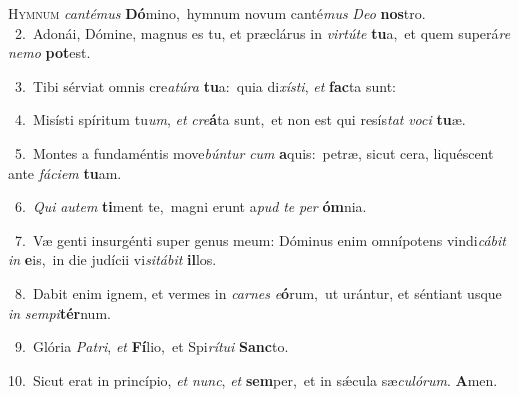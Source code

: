 \lettrine{\initial\textcolor{\initialcolor}{H}}{ymnum} \textit{can}\-\textit{té}\textit{mus} \textbf{Dó}\-mino,~\star hymnum novum canté\textit{mus} \textit{De}\-\textit{o} \textbf{nos}\-tro.\\
{\numbfont\textcolor{\numbcolor}{~2.}}~Adonái, Dómine, magnus es tu, et præclárus in \textit{vir}\-\textit{tú}\textit{te} \textbf{tu}\-a,~\star et quem superá\textit{re} \textit{ne}\-\textit{mo} \textbf{pot}\-est.\par
{\numbfont\textcolor{\numbcolor}{~3.}}~Tibi sérviat omnis cre\-\textit{a}\-\textit{tú}\textit{ra} \textbf{tu}\-a:~\star quia di\-\textit{xís}\-\textit{ti}, \textit{et} \textbf{fac}\-ta sunt:\par
{\numbfont\textcolor{\numbcolor}{~4.}}~Misísti spíritum tu\-\textit{um}\-, \textit{et} \textit{cre}\-\textbf{á}ta sunt,~\star et non est qui resís\textit{tat} \textit{vo}\-\textit{ci} \textbf{tu}\-æ.\par
{\numbfont\textcolor{\numbcolor}{~5.}}~Montes a fundaméntis move\-\textit{bún}\-\textit{tur} \textit{cum} \textbf{a}\-quis:~\star petræ, sicut cera, liquéscent ante \textit{fá}\-\textit{ci}\textit{em} \textbf{tu}\-am.\par
{\numbfont\textcolor{\numbcolor}{~6.}}~\textit{Qui} \textit{au}\-\textit{tem} \textbf{ti}\-ment te,~\star magni erunt a\textit{pud} \textit{te} \textit{per} \textbf{óm}\-nia.\par
{\numbfont\textcolor{\numbcolor}{~7.}}~Væ genti insurgénti super genus meum: Dóminus enim omnípotens vindi\-\textit{cá}\-\textit{bit} \textit{in} \textbf{e}\-is,~\star in die judícii vi\-\textit{si}\-\textit{tá}\textit{bit} \textbf{il}\-los.\par
{\numbfont\textcolor{\numbcolor}{~8.}}~Dabit enim ignem, et vermes in \textit{car}\-\textit{nes} \textit{e}\-\textbf{ó}rum,~\star ut urántur, et séntiant usque \textit{in} \textit{sem}\-\textit{pi}\textbf{tér}num.\par
{\numbfont\textcolor{\numbcolor}{~9.}}~Glória \textit{Pa}\-\textit{tri}, \textit{et} \textbf{Fí}\-lio,~\star et Spi\-\textit{rí}\-\textit{tu}\textit{i} \textbf{Sanc}\-to.\par
{\numbfont\textcolor{\numbcolor}{10.}}~Sicut erat in princípio, \textit{et} \textit{nunc}\-, \textit{et} \textbf{sem}\-per,~\star et in sǽcula sæ\-\textit{cu}\-\textit{ló}\textit{rum}. \textbf{A}\-men.\par
